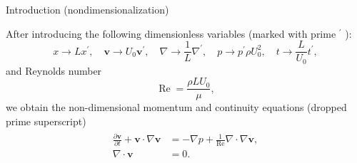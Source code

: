 \documentclass{beamer}
\begin{document}
  \begin{frame}{Introduction (nondimensionalization)}
  
  After introducing the following dimensionless variables (marked with prime ${ }^{\prime}$ ):
\begin{equation*}
	x\to Lx^{\prime},  \quad 
	\boldsymbol{v}\to U_0\boldsymbol{v}^{\prime}, \quad 
	\nabla\to \frac{1}{L}\nabla^{\prime}, \quad 
	p\to p^{\prime} \rho U_0^2, \quad 
	t\to \frac{L}{U_0}t^{\prime},
\end{equation*}
and Reynolds number 
\begin{equation*}
\operatorname{Re}=\frac{\rho L U_0}{\mu},
\end{equation*}
we obtain the non-dimensional momentum and continuity equations (dropped prime superscript)
	\begin{align}\label{eqs:NSE-nondim}
	\begin{split}
		\frac{\partial \boldsymbol{v}}{\partial t} + \boldsymbol{v} \cdot \nabla \boldsymbol{v} &= -\nabla p + \frac{1}{\operatorname{Re}} \nabla \cdot \nabla \boldsymbol{v},\\
		\nabla \cdot\boldsymbol{v}&=0.
	\end{split}
	\end{align}
  \end{frame}


  
  
  

  
	
\end{document}
